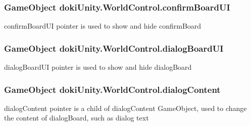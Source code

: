 \subsubsection[{\texorpdfstring{confirm\+Board\+UI}{confirmBoardUI}}]{\setlength{\rightskip}{0pt plus 5cm}Game\+Object doki\+Unity.\+World\+Control.\+confirm\+Board\+UI}\hypertarget{classdoki_unity_1_1_world_control_a323c9efc2a87491a2de3c1beae73d177}{}\label{classdoki_unity_1_1_world_control_a323c9efc2a87491a2de3c1beae73d177}


confirm\+Board\+UI pointer is used to show and hide confirm\+Board 

\subsubsection[{\texorpdfstring{dialog\+Board\+UI}{dialogBoardUI}}]{\setlength{\rightskip}{0pt plus 5cm}Game\+Object doki\+Unity.\+World\+Control.\+dialog\+Board\+UI}\hypertarget{classdoki_unity_1_1_world_control_a59c87f26e0e71d252a213a33d5fab725}{}\label{classdoki_unity_1_1_world_control_a59c87f26e0e71d252a213a33d5fab725}


dialog\+Board\+UI pointer is used to show and hide dialog\+Board 

\subsubsection[{\texorpdfstring{dialog\+Content}{dialogContent}}]{\setlength{\rightskip}{0pt plus 5cm}Game\+Object doki\+Unity.\+World\+Control.\+dialog\+Content}\hypertarget{classdoki_unity_1_1_world_control_a894d9bac26faeae9bde2ded0ca1e171e}{}\label{classdoki_unity_1_1_world_control_a894d9bac26faeae9bde2ded0ca1e171e}


dialog\+Content pointer is a child of dialog\+Content Game\+Object, used to change the content of dialog\+Board, such as dialog text 

